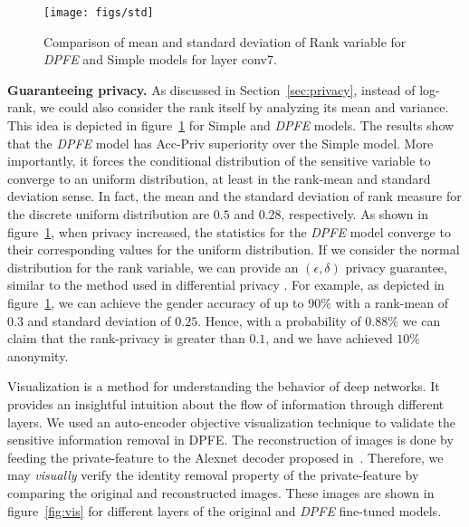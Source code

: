 \documentclass[10pt,journal,compsoc]{IEEEtran}
\newcommand{\alert}[1]{\textcolor{purple}{#1}}
\begin{document}
\begin{figure}[!h]
	\centering
	\texttt{[image: figs/std]}
	\caption{Comparison of mean and standard deviation of Rank variable for \emph{DPFE} and Simple models for layer conv7.}
	\label{fig:std_comparison}
\end{figure}\textbf{Guaranteeing privacy.} As discussed in Section~\ref{sec:privacy}, instead of log-rank, we could also consider the rank itself by analyzing its mean and variance. This idea is depicted in figure~\ref{fig:std_comparison} for Simple and \emph{DPFE} models. The results show that the \emph{DPFE} model has Acc-Priv superiority over the Simple model. More importantly, it forces the conditional distribution of the sensitive variable to converge to an uniform distribution, at least in the rank-mean and standard deviation sense. In fact, the mean and the standard deviation of rank measure for the discrete uniform distribution are $0.5$ and $0.28$, respectively. As shown in figure~\ref{fig:std_comparison}, when privacy increased, the statistics for the \emph{DPFE} model converge to their corresponding values for the uniform distribution. If we consider the normal distribution for the rank variable, we can provide an $(\epsilon,\delta)$ privacy guarantee, similar to the method used in differential privacy \cite{dwork06}. For example, as depicted in figure~\ref{fig:std_comparison}, we can achieve the gender accuracy of up to $90\%$ with a rank-mean of $0.3$ and standard deviation of $0.25$. Hence, with a probability of $0.88\%$ we can claim that the rank-privacy is greater than $0.1$, and we have achieved $10\%$ anonymity.


Visualization is a method for understanding the behavior of deep networks. It provides an insightful intuition about the flow of information through different layers. We used an auto-encoder objective visualization technique \cite{dosovitskiy2016} to validate the sensitive information removal in DPFE. %
The reconstruction of images is done by feeding the private-feature to the Alexnet decoder proposed in~\cite{dosovitskiy2016}. Therefore, we may \emph{visually} verify the identity removal property of the private-feature by comparing the original and reconstructed images. These images are shown in figure~\ref{fig:vis} for different layers of the original and \emph{DPFE} fine-tuned models. 
\end{document}
